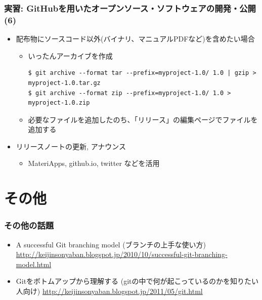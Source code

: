 \begin{frame}[t,fragile]
  \frametitle{実習: GitHubを用いたオープンソース・ソフトウェアの開発・公開(6)}
  \begin{itemize}
    \setlength{\itemsep}{1em}
  \item 配布物にソースコード以外(バイナリ、マニュアルPDFなど)を含めたい場合
    \begin{itemize}
    \item いったんアーカイブを作成
\begin{lstlisting}
$ git archive --format tar --prefix=myproject-1.0/ 1.0 | gzip > myproject-1.0.tar.gz
$ git archive --format zip --prefix=myproject-1.0/ 1.0 > myproject-1.0.zip
\end{lstlisting}
    \item 必要なファイルを追加したのち、「リリース」の編集ページでファイルを追加する
    \end{itemize}
  \item リリースノートの更新, アナウンス
    \begin{itemize}
    \item MateriApps, github.io, twitter などを活用
    \end{itemize}
  \end{itemize}
\end{frame}

\section{その他}

\begin{frame}
  \frametitle{その他の話題}
  \begin{itemize}
    \setlength{\itemsep}{1em}
  \item A successful Git branching model (ブランチの上手な使い方) \url{http://keijinsonyaban.blogspot.jp/2010/10/successful-git-branching-model.html}
  \item Gitをボトムアップから理解する (gitの中で何が起こっているのかを知りたい人向け) 
    \url{http://keijinsonyaban.blogspot.jp/2011/05/git.html}
  \end{itemize}
\end{frame}



